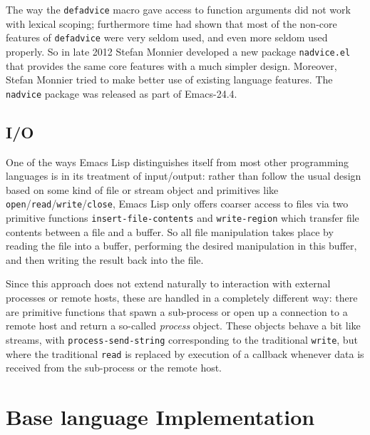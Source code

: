 \documentclass[format=acmsmall, review]{acmart}
\newcommand \Elisp {Emacs Lisp}
\begin{document}
The way the \texttt{defadvice} macro gave access to function arguments did
not work with lexical scoping; furthermore time had shown that most of the
non-core features of \texttt{defadvice} were very seldom used, and even more
seldom used properly.  So in late 2012 Stefan Monnier developed a new
package \texttt{nadvice.el} that provides the same core features with
a much simpler
design.  Moreover, Stefan Monnier tried to make better use of existing
language features.  The \texttt{nadvice} package was released as part
of Emacs-24.4.

\subsection{I/O}

One of the ways \Elisp{} distinguishes itself from most other programming
languages is in its treatment of input/output: rather than follow the usual
design based on some kind of file or stream object and primitives like
\texttt{open}/\texttt{read}/\texttt{write}/\texttt{close}, \Elisp{} only
offers coarser access to files via two primitive functions
\texttt{insert-file-contents} and \texttt{write-region} which transfer file
contents between a file and a buffer.  So all file manipulation takes place
by reading the file into a buffer, performing the desired manipulation in
this buffer, and then writing the result back into the file.

Since this approach does not extend naturally to interaction with external
processes or remote hosts, these are handled in a completely different way:
there are primitive functions that spawn a sub-process or open up
a connection to a remote host and return a so-called \emph{process} object.
These objects behave a bit like streams, with \texttt{process-send-string}
corresponding to the traditional \texttt{write}, but where the traditional
\texttt{read} is replaced by execution of a callback whenever data is
received from the sub-process or the remote host.

\section{Base language Implementation}
\label{sec:base-language-implementation}
\end{document}
